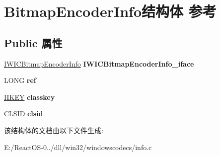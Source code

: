 \hypertarget{struct_bitmap_encoder_info}{}\section{Bitmap\+Encoder\+Info结构体 参考}
\label{struct_bitmap_encoder_info}
\subsection*{Public 属性}
\begin{DoxyCompactItemize}
\item 
\mbox{\label{struct_bitmap_encoder_info_aa79cde63f64fe1b7f022c56145302393}} 
\hyperlink{interface_i_w_i_c_bitmap_encoder_info}{I\+W\+I\+C\+Bitmap\+Encoder\+Info} {\bfseries I\+W\+I\+C\+Bitmap\+Encoder\+Info\+\_\+iface}
\item 
\mbox{\label{struct_bitmap_encoder_info_ae3cbcf32abe00bf774089c38bf5c2f72}} 
L\+O\+NG {\bfseries ref}
\item 
\mbox{\label{struct_bitmap_encoder_info_a653d316704ecfc2f16bb1c47bea8005c}} 
\hyperlink{interfacevoid}{H\+K\+EY} {\bfseries classkey}
\item 
\mbox{\label{struct_bitmap_encoder_info_a7ce42d279b2e13e0ca714b33703e5867}} 
\hyperlink{struct___i_i_d}{C\+L\+S\+ID} {\bfseries clsid}
\end{DoxyCompactItemize}


该结构体的文档由以下文件生成\+:\begin{DoxyCompactItemize}
\item 
E\+:/\+React\+O\+S-\/0../dll/win32/windowscodecs/info.\+c\end{DoxyCompactItemize}
